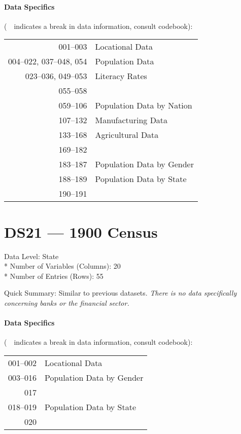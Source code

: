 ﻿\documentclass[12pt]{report}
\begin{document}
	\paragraph{Data Specifics} (\guillemotleft~\guillemotright~indicates a break in data information, consult codebook):
	\vspace{1em}
	
	\begin{tabular}{r|l}
		001--003 & Locational Data\\
		004--022, 037--048, 054 & Population Data\\
		023--036, 049--053 & Literacy Rates\\
		055--058 & \guillemotleft~\guillemotright\\
		059--106 & Population Data by Nation\\
		107--132 & Manufacturing Data\\
		133--168 & Agricultural Data\\
		169--182 & \guillemotleft~\guillemotright\\
		183--187 & Population Data by Gender\\
		188--189 & Population Data by State\\
		190--191 & \guillemotleft~\guillemotright
	\end{tabular}
	\newpage

\section{DS21 --- 1900 Census}
	Data Level: State\\*
	Number of Variables (Columns): 20\\*
	Number of Entries (Rows): 55
	\vspace{1.5em}
	
	\noindent Quick Summary: Similar to previous datasets. \textit{There is no data specifically concerning banks or the financial sector.}
	
	\paragraph{Data Specifics} (\guillemotleft~\guillemotright~indicates a break in data information, consult codebook):
	\vspace{1em}
	
	\begin{tabular}{r|l}
		001--002 & Locational Data\\
		003--016 & Population Data by Gender\\
		017 & \guillemotleft~\guillemotright\\
		018--019 & Population Data by State\\
		020 & \guillemotleft~\guillemotright
	\end{tabular}
	\newpage
\end{document}
